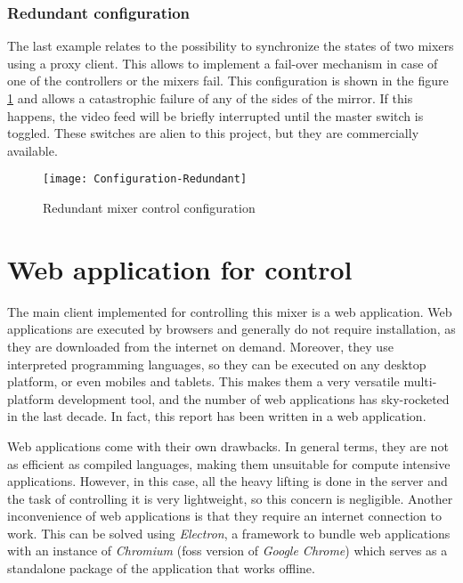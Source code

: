 \documentclass[../main.tex]{subfiles}
\begin{document}
\subsubsection{Redundant configuration}
The last example relates to the possibility to synchronize the states of two mixers using a proxy client. This allows to implement a fail-over mechanism in case of one of the controllers or the mixers fail. This configuration is shown in the figure \ref{fig:04:configuration_redundant} and allows a catastrophic failure of any of the sides of the mirror. If this happens, the video feed will be briefly interrupted until the master switch is toggled. These switches are alien to this project, but they are commercially available.\newline

\begin{figure}[htbp]
    \centering
    \texttt{[image: Configuration-Redundant]}

    \caption{Redundant mixer control configuration}
    \label{fig:04:configuration_redundant}
\end{figure}



\section{Web application for control}
The main client implemented for controlling this mixer is a web application. Web applications are executed by browsers and generally do not require installation, as they are downloaded from the internet on demand. Moreover, they use interpreted programming languages, so they can be executed on any desktop platform, or even mobiles and tablets. This makes them a very versatile multi-platform development tool, and the number of web applications has sky-rocketed in the last decade. In fact, this report has been written in a web application.\newline

Web applications come with their own drawbacks. In general terms, they are not as efficient as compiled languages, making them unsuitable for compute intensive applications. However, in this case, all the heavy lifting is done in the server and the task of controlling it is very lightweight, so this concern is negligible. Another inconvenience of web applications is that they require an internet connection to work. This can be solved using \textit{Electron}, a framework to bundle web applications with an instance of \textit{Chromium} (\gls{foss} version of \textit{Google Chrome}) which serves as a standalone package of the application that works offline.\newline
\end{document}
